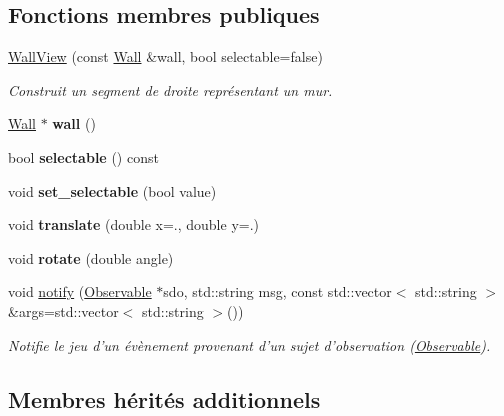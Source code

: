 \subsection*{Fonctions membres publiques}
\begin{DoxyCompactItemize}
\item 
\hyperlink{classWallView_acd55794debfd67a8f2b9088d3fb2e0dc}{Wall\+View} (const \hyperlink{classWall}{Wall} \&wall, bool selectable=false)
\begin{DoxyCompactList}\small\item\em Construit un segment de droite représentant un mur. \end{DoxyCompactList}\item 
\hypertarget{classWallView_af93a05e8e527a55158707802c2f16911}{\hyperlink{classWall}{Wall} $\ast$ {\bfseries wall} ()}\label{classWallView_af93a05e8e527a55158707802c2f16911}

\item 
\hypertarget{classWallView_a674eb428edf9826a41616bc3f8618044}{bool {\bfseries selectable} () const }\label{classWallView_a674eb428edf9826a41616bc3f8618044}

\item 
\hypertarget{classWallView_ab47e5401e6addcc68d84f702800cc282}{void {\bfseries set\+\_\+selectable} (bool value)}\label{classWallView_ab47e5401e6addcc68d84f702800cc282}

\item 
\hypertarget{classWallView_ae0a076aeec6ff504c6daacd5900400ec}{void {\bfseries translate} (double x=., double y=.)}\label{classWallView_ae0a076aeec6ff504c6daacd5900400ec}

\item 
\hypertarget{classWallView_a76fa8b376ea01d443754251210232f78}{void {\bfseries rotate} (double angle)}\label{classWallView_a76fa8b376ea01d443754251210232f78}

\item 
void \hyperlink{classWallView_a193f9046366f016fd6361caa7ff1b710}{notify} (\hyperlink{classObservable}{Observable} $\ast$sdo, std\+::string msg, const std\+::vector$<$ std\+::string $>$ \&args=std\+::vector$<$ std\+::string $>$())
\begin{DoxyCompactList}\small\item\em Notifie le jeu d'un évènement provenant d'un sujet d'observation (\hyperlink{classObservable}{Observable}). \end{DoxyCompactList}\end{DoxyCompactItemize}
\subsection*{Membres hérités additionnels}


